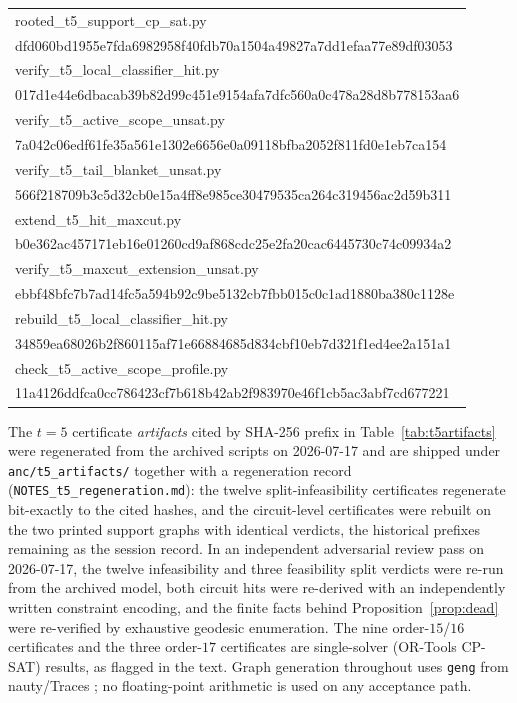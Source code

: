 \documentclass[11pt]{article}
\theoremstyle{definition}
\begin{document}
{\small\ttfamily\begin{tabular}{l}
rooted\_t5\_support\_cp\_sat.py\\
\quad dfd060bd1955e7fda6982958f40fdb70a1504a49827a7dd1efaa77e89df03053\\
verify\_t5\_local\_classifier\_hit.py\\
\quad 017d1e44e6dbacab39b82d99c451e9154afa7dfc560a0c478a28d8b778153aa6\\
verify\_t5\_active\_scope\_unsat.py\\
\quad 7a042c06edf61fe35a561e1302e6656e0a09118bfba2052f811fd0e1eb7ca154\\
verify\_t5\_tail\_blanket\_unsat.py\\
\quad 566f218709b3c5d32cb0e15a4ff8e985ce30479535ca264c319456ac2d59b311\\
extend\_t5\_hit\_maxcut.py\\
\quad b0e362ac457171eb16e01260cd9af868cdc25e2fa20cac6445730c74c09934a2\\
verify\_t5\_maxcut\_extension\_unsat.py\\
\quad ebbf48bfc7b7ad14fc5a594b92c9be5132cb7fbb015c0c1ad1880ba380c1128e\\
rebuild\_t5\_local\_classifier\_hit.py\\
\quad 34859ea68026b2f860115af71e66884685d834cbf10eb7d321f1ed4ee2a151a1\\
check\_t5\_active\_scope\_profile.py\\
\quad 11a4126ddfca0cc786423cf7b618b42ab2f983970e46f1cb5ac3abf7cd677221
\end{tabular}}

\medskip
The \(t=5\) certificate \emph{artifacts} cited by SHA-256 prefix in
Table~\ref{tab:t5artifacts} were regenerated from the archived scripts
on 2026-07-17 and are shipped under \texttt{anc/t5\_artifacts/}
together with a regeneration record
(\texttt{NOTES\_t5\_regeneration.md}): the twelve split-infeasibility
certificates regenerate bit-exactly to the cited hashes, and the
circuit-level certificates were rebuilt on the two printed support
graphs with identical verdicts, the historical prefixes remaining as
the session record. In an independent adversarial
review pass on 2026-07-17, the twelve infeasibility and three
feasibility split verdicts were re-run from the archived model, both
circuit hits were re-derived with an independently written constraint
encoding, and the finite facts behind Proposition~\ref{prop:dead} were
re-verified by exhaustive geodesic enumeration. The nine
order-\(15\)/\(16\) certificates and the three order-\(17\)
certificates are single-solver (OR-Tools CP-SAT) results, as flagged
in the text. Graph generation throughout uses \texttt{geng} from
nauty/Traces \cite{McKayPiperno14}; no floating-point arithmetic is
used on any acceptance path.
\end{document}

